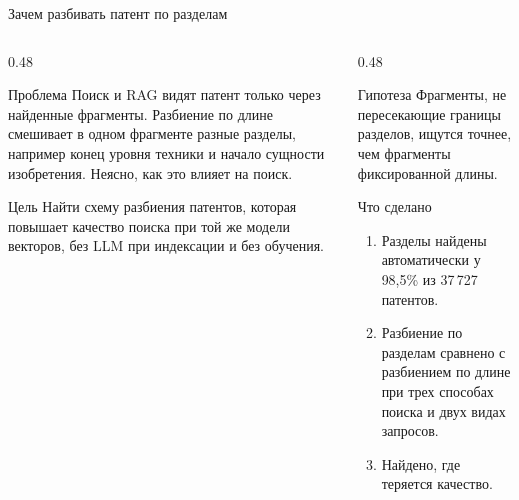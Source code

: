 \documentclass[aspectratio=169]{beamer}
\begin{document}
\begin{frame}{Зачем разбивать патент по разделам}
    \small
    \begin{columns}[T]
        \begin{column}{0.48\textwidth}
            \begin{alertblock}{Проблема}
                Поиск и RAG видят патент только через найденные фрагменты.
                Разбиение по длине смешивает в одном фрагменте разные разделы, например конец уровня техники и начало сущности изобретения.
                Неясно, как это влияет на поиск.
            \end{alertblock}
            \begin{block}{Цель}
                Найти схему разбиения патентов, которая повышает качество поиска при той же модели векторов, без LLM при индексации и без обучения.
            \end{block}
        \end{column}
        \begin{column}{0.48\textwidth}
            \begin{block}{Гипотеза}
                Фрагменты, не пересекающие границы разделов, ищутся точнее, чем фрагменты фиксированной длины.
            \end{block}
            \begin{exampleblock}{Что сделано}
                \begin{enumerate}[1)]
                    \item Разделы найдены автоматически у 98,5\% из 37\,727 патентов.
                    \item Разбиение по разделам сравнено с разбиением по длине при трех способах поиска и двух видах запросов.
                    \item Найдено, где теряется качество.
                \end{enumerate}
            \end{exampleblock}
        \end{column}
    \end{columns}
\end{frame}
\end{document}
